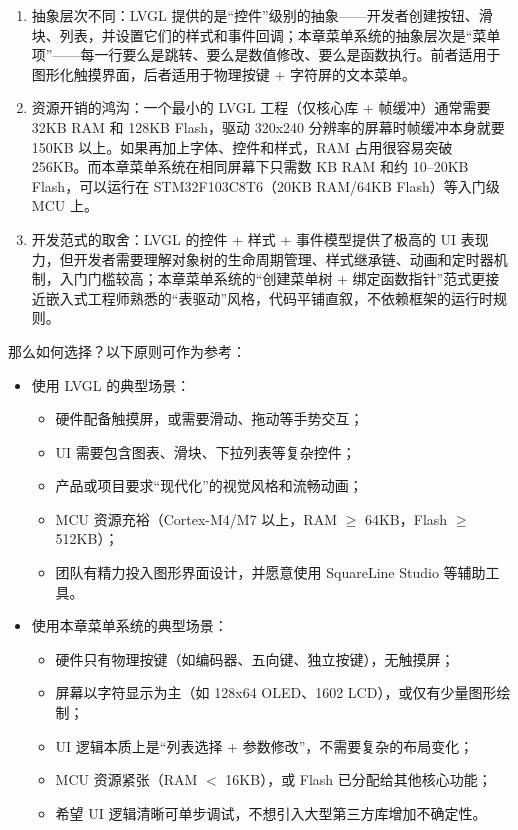 \begin{enumerate}
	\item 抽象层次不同：LVGL 提供的是“控件”级别的抽象——开发者创建按钮、滑块、列表，并设置它们的样式和事件回调；本章菜单系统的抽象层次是“菜单项”——每一行要么是跳转、要么是数值修改、要么是函数执行。前者适用于图形化触摸界面，后者适用于物理按键 + 字符屏的文本菜单。
	
	\item 资源开销的鸿沟：一个最小的 LVGL 工程（仅核心库 + 帧缓冲）通常需要 32KB RAM 和 128KB Flash，驱动 320x240 分辨率的屏幕时帧缓冲本身就要 150KB 以上。如果再加上字体、控件和样式，RAM 占用很容易突破 256KB。而本章菜单系统在相同屏幕下只需数 KB RAM 和约 10--20KB Flash，可以运行在 STM32F103C8T6（20KB RAM/64KB Flash）等入门级 MCU 上。
	
	\item 开发范式的取舍：LVGL 的控件 + 样式 + 事件模型提供了极高的 UI 表现力，但开发者需要理解对象树的生命周期管理、样式继承链、动画和定时器机制，入门门槛较高；本章菜单系统的“创建菜单树 + 绑定函数指针”范式更接近嵌入式工程师熟悉的“表驱动”风格，代码平铺直叙，不依赖框架的运行时规则。
\end{enumerate}

那么如何选择？以下原则可作为参考：

\begin{itemize}
	\item 使用 LVGL 的典型场景：
	\begin{itemize}
		\item 硬件配备触摸屏，或需要滑动、拖动等手势交互；
		\item UI 需要包含图表、滑块、下拉列表等复杂控件；
		\item 产品或项目要求“现代化”的视觉风格和流畅动画；
		\item MCU 资源充裕（Cortex-M4/M7 以上，RAM $\geq$ 64KB，Flash $\geq$ 512KB）；
		\item 团队有精力投入图形界面设计，并愿意使用 SquareLine Studio 等辅助工具。
	\end{itemize}
	
	\item 使用本章菜单系统的典型场景：
	\begin{itemize}
		\item 硬件只有物理按键（如编码器、五向键、独立按键），无触摸屏；
		\item 屏幕以字符显示为主（如 128x64 OLED、1602 LCD），或仅有少量图形绘制；
		\item UI 逻辑本质上是“列表选择 + 参数修改”，不需要复杂的布局变化；
		\item MCU 资源紧张（RAM $<$ 16KB），或 Flash 已分配给其他核心功能；
		\item 希望 UI 逻辑清晰可单步调试，不想引入大型第三方库增加不确定性。
	\end{itemize}
\end{itemize}

